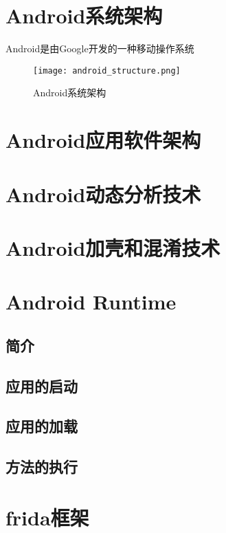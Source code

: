 \section{Android系统架构}
Android是由Google开发的一种移动操作系统
\begin{figure}[ht]
	\centering
	\texttt{[image: android\_structure.png]}
	\caption{Android系统架构}
	\label{fig:1}
\end{figure}
\section{Android应用软件架构}
\section{Android动态分析技术}
\section{Android加壳和混淆技术}
\section{Android Runtime}
\subsection{简介}
\subsection{应用的启动}
\subsection{应用的加载}
\subsection{方法的执行}
\section{frida框架}

